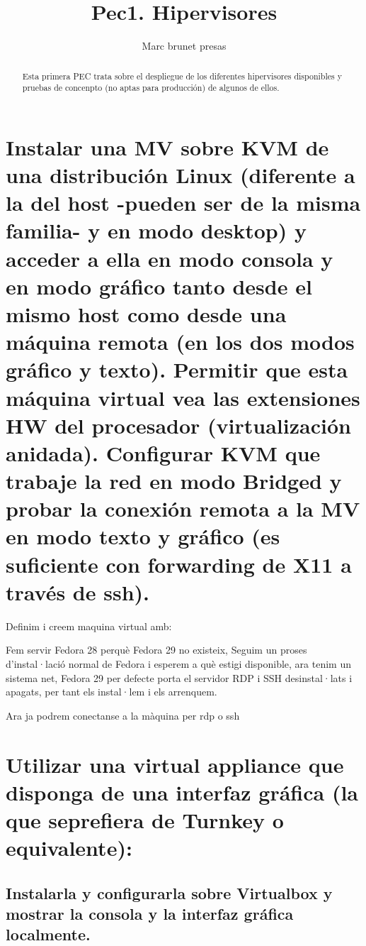 \documentclass[preprint,11pt]{elsarticle}
\begin{document}
\begin{frontmatter}

    \title{Pec1. Hipervisores}
    \author{Marc brunet presas}
    \address{Manresa, Barcelona}
    \begin{abstract}
        Esta primera PEC trata sobre el despliegue de los diferentes hipervisores disponibles y pruebas de concenpto (no aptas para producción) de algunos de ellos.
    \end{abstract}
\end{frontmatter}

\section{Instalar una MV sobre KVM de una distribución Linux (diferente a la del host -pueden ser de la misma familia- y en modo desktop) y acceder a ella en modo consola y en modo gráfico tanto desde el mismo host como desde una máquina remota (en los dos modos gráfico y texto). Permitir que esta máquina virtual vea las extensiones HW del procesador (virtualización anidada). \newline 
Configurar KVM que trabaje la red en modo Bridged y probar la conexión remota a la MV en modo texto y gráfico (es suficiente con forwarding de X11 a través de ssh).}

Definim i creem maquina virtual amb:
\smallskip

Fem servir Fedora 28 perquè Fedora 29 no existeix, Seguim un proses d'instal·lació normal de Fedora i esperem a què estigi disponible, ara tenim un sistema net, Fedora 29 per defecte porta el servidor RDP i SSH desinstal·lats i apagats, per tant els instal·lem i els arrenquem.
\smallskip

Ara ja podrem conectanse a la màquina per rdp o ssh

\clearpage

\section{Utilizar una virtual appliance que disponga de una interfaz gráfica (la que seprefiera de Turnkey o equivalente):}
\subsection{Instalarla y configurarla sobre Virtualbox y mostrar la consola y la interfaz gráfica localmente.}
\end{document}
